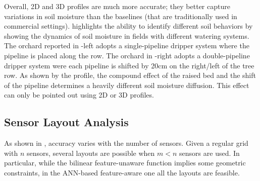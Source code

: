 Overall, 2D and 3D profiles are much more accurate; they better capture variations in soil moisture than the baselines (that are traditionally used in commercial settings).  highlights the ability to identify different soil behaviors by showing the dynamics of soil moisture in fields with different watering systems. The orchard reported in -left adopts a single-pipeline dripper system where the pipeline is placed along the row. 
The orchard in -right adopts a double-pipeline dripper system were each pipeline is shifted by 20cm on the right/left of the tree row.
As shown by the profile, the compound effect of the raised bed and the shift of the pipeline determines a heavily different soil moisture diffusion.
This effect can only be pointed out using 2D or 3D profiles.

\subsection{Sensor Layout Analysis}
\label{pluto-sec:sensors_disposal_evaluation}
As shown in , accuracy varies with the number of sensors. 
Given a regular grid with $n$ sensors, several layouts are possible when $m<n$ sensors are used.  
In particular, while the bilinear feature-unaware function implies some geometric constraints, in the ANN-based feature-aware one all the layouts are feasible.

